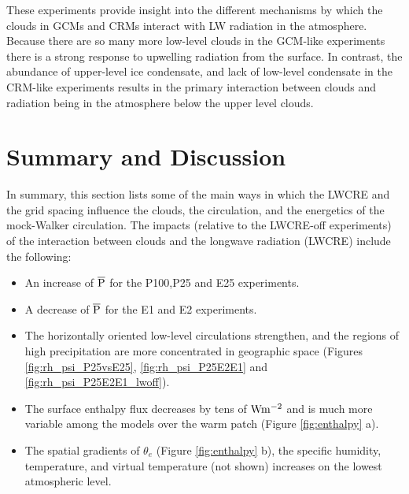 \documentclass[draft]{agujournal2019}
\begin{document}
{These experiments provide insight into the different mechanisms by which the clouds in GCMs and CRMs
interact with LW radiation in the atmosphere.  Because there are so many more low-level clouds in 
the GCM-like experiments there is a strong response to upwelling radiation from the surface.  In contrast, 
the abundance of upper-level ice condensate, and lack of low-level condensate in the CRM-like experiments 
results in the primary interaction between clouds and radiation being in the atmosphere below the upper level clouds.       

 

\section{Summary and Discussion} 

In summary, this section lists some of the main ways in which the LWCRE and the grid spacing influence
the clouds, the circulation, and the energetics of the mock-Walker circulation.   
The impacts (relative to the LWCRE-off experiments) of the interaction between clouds and the longwave radiation 
(LWCRE) include the following: 

\begin{itemize}
  \item {An increase of $\overline{\rm{P}}$  for the P100,P25 and E25 experiments.}
  \item {A decrease of $\overline{\rm{P}}$  for the E1 and E2 experiments.}
  \item {The horizontally oriented low-level circulations strengthen, and the regions of high precipitation are more concentrated  
  in geographic space (Figures \ref{fig:rh_psi_P25vsE25}, \ref{fig:rh_psi_P25E2E1} and \ref{fig:rh_psi_P25E2E1_lwoff}).  }
  \item {The surface enthalpy flux decreases by tens of $\rm{W m^{-2}}$ and is much more variable among the models over the warm patch (Figure \ref{fig:enthalpy} a).}
  \item {The spatial gradients of $\theta_e$ (Figure \ref{fig:enthalpy} b), the specific humidity, temperature, and virtual temperature 
  (not shown) increases on the lowest atmospheric level.  }
 {    }
\end{itemize}

}
\end{document}
